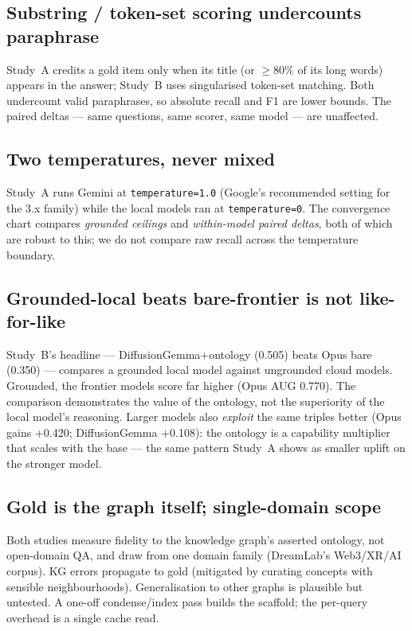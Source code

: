 \documentclass[11pt]{article}
\begin{document}
\begin{samepage}
\subsection{Substring / token-set scoring undercounts paraphrase}
Study~A credits a gold item only when its title (or $\geq 80\%$ of its long words) appears in the
answer; Study~B uses singularised token-set matching. Both undercount valid paraphrases, so
absolute recall and F1 are lower bounds. The paired deltas --- same questions, same scorer, same
model --- are unaffected.
\end{samepage}

\begin{samepage}
\subsection{Two temperatures, never mixed}
Study~A runs Gemini at \texttt{temperature=1.0} (Google's recommended setting for the 3.x family)
while the local models ran at \texttt{temperature=0}. The convergence chart compares
\emph{grounded ceilings} and \emph{within-model paired deltas}, both of which are robust to this;
we do not compare raw recall across the temperature boundary.
\end{samepage}

\begin{samepage}
\subsection{Grounded-local beats bare-frontier is not like-for-like}
Study~B's headline --- DiffusionGemma+ontology (0.505) beats Opus bare (0.350) --- compares a
grounded local model against ungrounded cloud models. Grounded, the frontier models score far
higher (Opus AUG 0.770). The comparison demonstrates the value of the ontology, not the
superiority of the local model's reasoning. Larger models also \emph{exploit} the same triples
better (Opus gains +0.420; DiffusionGemma +0.108): the ontology is a capability multiplier that
scales with the base --- the same pattern Study~A shows as smaller uplift on the stronger model.
\end{samepage}

\begin{samepage}
\subsection{Gold is the graph itself; single-domain scope}
Both studies measure fidelity to the knowledge graph's asserted ontology, not open-domain QA, and
draw from one domain family (DreamLab's Web3/XR/AI corpus). KG errors propagate to gold (mitigated
by curating concepts with sensible neighbourhoods). Generalisation to other graphs is plausible
but untested. A one-off condense/index pass builds the scaffold; the per-query overhead is a
single cache read.
\end{samepage}
\end{document}
